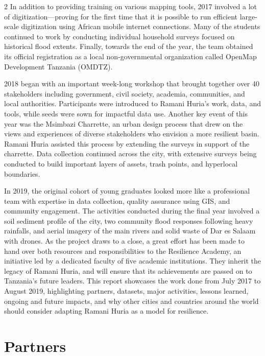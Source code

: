 \documentclass[a4paper,12pt,twoside]{article}
\begin{document}
\begin{multicols} {2}
In addition to providing training on various mapping tools, 2017  involved a lot of digitization—proving for the first time  that it is possible to run efficient large-scale digitization using African mobile internet connections. Many of the students continued to work by conducting individual household surveys focused on historical flood extents. Finally, towards the end of the year, the team obtained its official registration as a local non-governmental organization called OpenMap Development Tanzania (OMDTZ). 

2018 began with an important week-long workshop that brought together over 40 stakeholders including government, civil society, academia, communities, and local authorities. Participants were introduced to Ramani Huria’s work, data, and tools, while seeds were sown for impactful data use. Another key event of this year was the Msimbazi Charrette, an urban design process that drew on the views and experiences of diverse stakeholders who envision a more resilient basin. Ramani Huria assisted this process by extending the surveys in support of the charrette. Data collection continued across the city, with extensive surveys being conducted to build important layers of assets, trash points, and hyperlocal boundaries. 

In 2019, the original cohort of young graduates looked more like a professional team with expertise in data collection, quality assurance using GIS, and community engagement. The activities conducted during the final year involved a soil sediment profile of the city, two community flood responses following heavy rainfalls, and aerial imagery of the main rivers and solid waste of Dar es Salaam with drones. 
As the project draws to a close, a great effort has been made to hand over both resources and responsibilities to the Resilience Academy, an initiative led by a dedicated faculty of five academic institutions. They inherit the legacy of Ramani Huria, and will ensure that its achievements are passed on to Tanzania’s future leaders. 
This report showcases the work done from July 2017 to August 2019, highlighting partners, datasets, major activities, lessons learned, ongoing and future impacts, and why other cities and countries around the world should consider adapting Ramani Huria as a model for resilience.
\end{multicols}

\newpage
\section{Partners}
\end{document}
